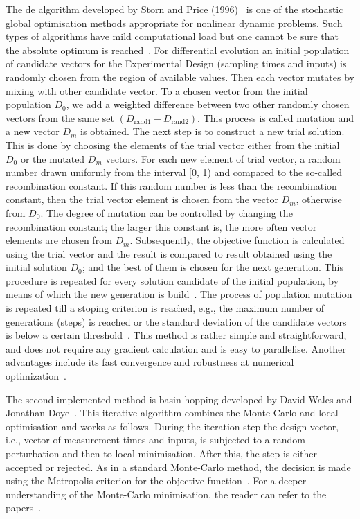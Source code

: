 \documentclass[10pt,A4paper]{article}
\begin{document}
The \ac{de} algorithm developed by Storn and Price (1996)~\cite{stornDifferentialEvolutionSimple1997} is one of the stochastic global optimisation methods appropriate for nonlinear dynamic problems.
Such types of algorithms have mild computational load but one cannot be sure that the absolute optimum is reached~\cite{balsa-cantoe.bangaj.r.COMPUTINGOPTIMALDYNAMIC2008}.
For differential evolution an initial population of candidate vectors for the Experimental Design (sampling times and inputs) is randomly chosen from the region of available values.
Then each vector mutates by mixing with other candidate vector.
To a chosen vector from the initial population $D_0$, we add a weighted difference between two other randomly chosen vectors from the same set $(D_\text{rand1} - D_\text{rand2})$.
This process is called mutation and a new vector $D_m$ is obtained.
The next step is to construct a new trial solution.
This is done by choosing the elements of the trial vector either from the initial $D_0$ or the mutated $D_m$ vectors. 
For each new element of trial vector, a random number drawn uniformly from the interval [0, 1) and compared to the so-called recombination constant.
If this random number is less than the recombination constant, then the trial vector element is chosen from the vector $D_m$, otherwise from $D_0$.
The degree of mutation can be controlled by changing the recombination constant; the larger this constant is, the more often vector elements are chosen from $D_m$.
Subsequently, the objective function is calculated using the trial vector and the result is compared to result obtained using the initial solution $D_0$; and the best of them is chosen for the next generation.
This procedure is repeated for every solution candidate of the initial population, by means of which the new generation is build~\cite{scipydiffev}.
The process of population mutation is repeated till a stoping criterion is reached, e.g., the maximum number of generations (steps) is reached or the standard deviation of the candidate vectors is below a certain threshold~\cite{Zielinski_DE}.
This method is rather simple and straightforward, and does not require any gradient calculation and is easy to parallelise.
Another advantages include its fast convergence and robustness at numerical optimization~\cite{babu_differential_2007}.
\newline

The second implemented method is basin-hopping developed by David Wales and Jonathan Doye~\cite{walesGlobalOptimizationBasinHopping1997}.
This iterative algorithm combines the Monte-Carlo and local optimisation and works as follows.
During the iteration step the design vector, i.e., vector of measurement times and inputs, is subjected to a random perturbation and then to local minimisation.
After this, the step is either accepted or rejected.
As in a standard Monte-Carlo method, the decision is made using the Metropolis criterion for the objective function~\cite{scipybashop}.
For a deeper understanding of the Monte-Carlo minimisation, the reader can refer to the papers~\cite{li_monte_1987, beichl_metropolis_2000}.
\newline
\end{document}
